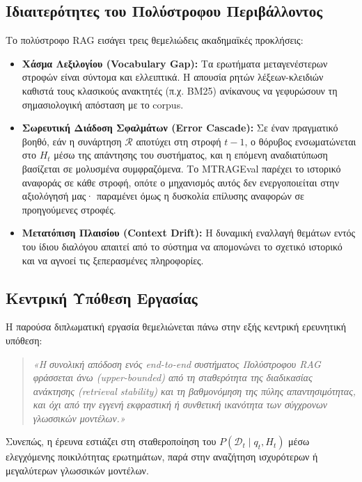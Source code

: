\subsection{Ιδιαιτερότητες του Πολύστροφου Περιβάλλοντος}

Το πολύστροφο RAG εισάγει τρεις θεμελιώδεις ακαδημαϊκές προκλήσεις:
\begin{itemize}
    \item \textbf{Χάσμα Λεξιλογίου (Vocabulary Gap):} Τα ερωτήματα μεταγενέστερων στροφών είναι σύντομα και ελλειπτικά. Η απουσία ρητών λέξεων-κλειδιών καθιστά τους κλασικούς ανακτητές (π.χ. BM25) ανίκανους να γεφυρώσουν τη σημασιολογική απόσταση με το corpus.
    \item \textbf{Σωρευτική Διάδοση Σφαλμάτων (Error Cascade):} Σε έναν πραγματικό βοηθό, εάν η συνάρτηση $\mathcal{R}$ αποτύχει στη στροφή $t-1$, ο θόρυβος ενσωματώνεται στο $H_t$ μέσω της απάντησης του συστήματος, και η επόμενη αναδιατύπωση βασίζεται σε μολυσμένα συμφραζόμενα. Το MTRAGEval παρέχει το ιστορικό αναφοράς σε κάθε στροφή, οπότε ο μηχανισμός αυτός δεν ενεργοποιείται στην αξιολόγησή μας· παραμένει όμως η δυσκολία επίλυσης αναφορών σε προηγούμενες στροφές.
    \item \textbf{Μετατόπιση Πλαισίου (Context Drift):} Η δυναμική εναλλαγή θεμάτων εντός του ίδιου διαλόγου απαιτεί από το σύστημα να απομονώνει το σχετικό ιστορικό και να αγνοεί τις ξεπερασμένες πληροφορίες.
\end{itemize}

\subsection{Κεντρική Υπόθεση Εργασίας}

Η παρούσα διπλωματική εργασία θεμελιώνεται πάνω στην εξής κεντρική ερευνητική υπόθεση:
\begin{quote}
\textit{«Η συνολική απόδοση ενός end-to-end συστήματος Πολύστροφου RAG φράσσεται άνω (upper-bounded) από τη σταθερότητα της διαδικασίας ανάκτησης (retrieval stability) και τη βαθμονόμηση της πύλης απαντησιμότητας, και όχι από την εγγενή εκφραστική ή συνθετική ικανότητα των σύγχρονων γλωσσικών μοντέλων.»}
\end{quote}
Συνεπώς, η έρευνα εστιάζει στη σταθεροποίηση του $P(\mathcal{D}_t \mid q_t, H_t)$ μέσω ελεγχόμενης ποικιλότητας ερωτημάτων, παρά στην αναζήτηση ισχυρότερων ή μεγαλύτερων γλωσσικών μοντέλων.

